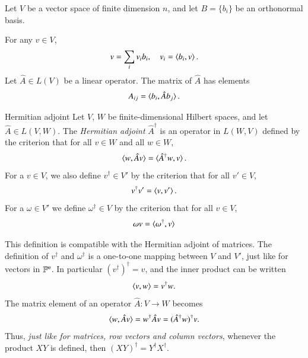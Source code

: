 \begin{myTheorem}{}{}
    Let $V$ be a vector space of finite dimension $n$, and let $B = \{ b_i\}$ be an orthonormal basis.

    For any $v \in V$,
    \begin{equation}
        v = \sum_i v_i b_i, \quad v_i = \braket{b_i,v}.
    \end{equation}
    Let $\hat{A} \in L(V)$ be a linear operator.  The matrix of $\hat{A}$ has elements 
    \begin{equation}
        A_{ij} = \braket{b_i, \hat{A} b_j}.
    \end{equation}
\end{myTheorem}


\begin{myDefinition}{Hermitian adjoint}{}
    Let $V$, $W$ be finite-dimensional Hilbert spaces, and let $\hat{A} \in L(V,W)$. The \emph{Hermitian adjoint} $\hat{A}^\dag$ is an operator in $L(W,V)$ defined by the criterion that for all $v\in W$ and all $w \in W$,
    \begin{equation}
        \braket{w,\hat{A}v} = \braket{\hat{A}^\dag w, v}.
    \end{equation}
    For a $v\in V$, we also define $v^\dag \in V'$ by the criterion that for all $v' \in V$,
    \begin{equation}
        v^\dag v' = \braket{v,v'}.
    \end{equation}
    For a $\omega \in V'$ we define $\omega^\dag \in V$ by the criterion that for all $v \in V$,
    \begin{equation}
        \omega v = \braket{\omega^\dag, v}
    \end{equation}
\end{myDefinition}

\begin{myRemark}{}{}
This definition is compatible with the Hermitian adjoint of matrices. The definition of $v^\dag$ and $\omega^\dag$ is a one-to-one mapping between $V$ and $V'$, just like for vectors in $\mathbb{F}^n$. In particular $(v^\dag)^\dag = v$, and the inner product can be written
\begin{equation}
    \braket{v,w} = v^\dag w.
\end{equation}
The matrix element of an operator $\hat{A} : V \to W$ becomes
\begin{equation}
    \braket{w,\hat{A} v} = w^\dag \hat{A} v = (\hat{A}^\dag w)^\dag v.
\end{equation}
Thus, \emph{just like for matrices, row vectors and column vectors}, whenever the product $XY$ is defined, then $(XY)^\dag = Y^\dag X^\dag$.
\end{myRemark}


